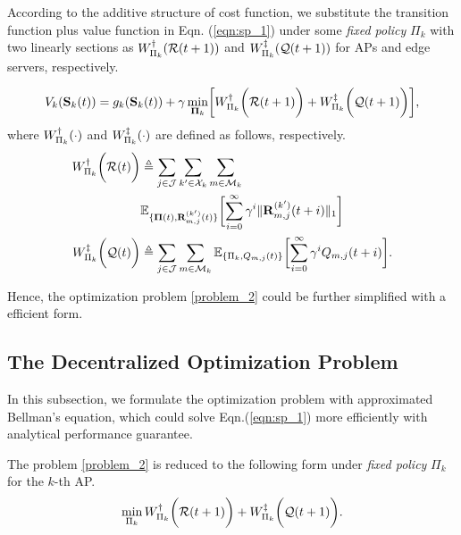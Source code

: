 According to the additive structure of cost function, we substitute the transition function plus value function in Eqn. (\ref{eqn:sp_1}) under some \emph{fixed policy} $\Pi_{k}$ with two linearly sections as $W^{\dagger}_{\Pi_{k}}(\mathcal{R}(t+1))$ and $W^{\ddagger}_{\Pi_{k}}(\mathcal{Q}(t+1))$ for APs and edge servers, respectively.
\begin{definition}
    \begin{align}
        V_{k}(\Stat_{k}(t)) = g_{k}(\Stat_{k}(t)) + \gamma \min_{\Baseline_{k}} \Bracket{
            W^{\AP}_{\Pi_{k}}\Paren{\mathcal{R}(t+1)} + W^{\ES}_{\Pi_{k}}\Paren{\mathcal{Q}(t+1)}
        },
    \end{align}
    where $W^{\dagger}_{\Pi_{k}}(\cdot)$ and $W^{\ddagger}_{\Pi_{k}}(\cdot)$ are defined as follows, respectively.
    \begin{align}
        W^{\AP}_{\Pi_{k}}\Paren{\mathcal{R}(t)}
            &\define \sum_{j\in\jSpace}\sum_{k'\in\ccSet_{k}}\sum_{m\in\esSet_{k}}
            \nonumber\\
            &\mathbb{E}_{\{\Baseline(t), \vec{R}^{(k')}_{m,j}(t)\}}\Bracket{
                \sum_{i=0}^{\infty} \gamma^{i} \Inorm{\vec{R}^{(k')}_{m,j}({t+i})}
            }
        \\
        W^{\ES}_{\Pi_{k}}\Paren{\mathcal{Q}(t)}
            &\define \sum_{j\in\jSpace}\sum_{m\in\esSet_{k}}
            \mathbb{E}_{\{\Pi_{k}, Q_{m,j}(t)\}}\Bracket{
                \sum_{i=0}^{\infty} \gamma^{i} Q_{m,j}({t+i})
            }.
    \end{align}
\end{definition}
Hence, the optimization problem \ref{problem_2} could be further simplified with a efficient form.

\subsection{The Decentralized Optimization Problem}
In this subsection, we formulate the optimization problem with approximated Bellman's equation, which could solve Eqn.(\ref{eqn:sp_1}) more efficiently with analytical performance guarantee.
\begin{problem}
    The problem \ref{problem_2} is reduced to the following form under \emph{fixed policy} $\Pi_{k}$ for the $k$-th AP.
    \begin{align}
        \min_{\Pi_{k}} W^{\dagger}_{\Pi_{k}}\bigg(\mathcal{R}(t+1)\bigg) + W^{\ddagger}_{\Pi_{k}}\bigg(\mathcal{Q}(t+1)\bigg).
        \label{eqn:partial}
    \end{align}
\end{problem}

